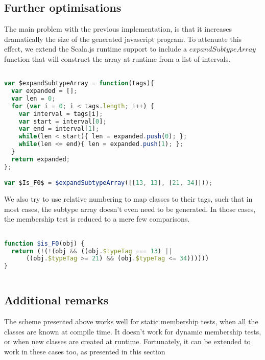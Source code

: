 \subsection{Further optimisations}
The main problem with the previous implementation, is that it increases
dramatically the size of the generated javascript program. To attenuate this
effect, we extend the Scala.js runtime support to include a
$expandSubtypeArray$ function that will construct the array at runtime from a
list of intervals.\\

\begin{lstlisting}[language=javascript,caption=Compressed subtype array,
label={lst:expandSubtypeArray}]

var $expandSubtypeArray = function(tags){
  var expanded = [];
  var len = 0;
  for (var i = 0; i < tags.length; i++) {
    var interval = tags[i];
    var start = interval[0];
    var end = interval[1];
    while(len < start){ len = expanded.push(0); };
    while(len <= end){ len = expanded.push(1); };
  }
  return expanded;
};

var $Is_F0$ = $expandSubtypeArray([[13, 13], [21, 34]]));
\end{lstlisting}

We also try to use relative numbering \cite{relativeNumbering} to map classes
to their tags, such that in most cases, the subtype array doesn't even need to
be generated. In those cases, the membership test is reduced to a mere few
comparisons.

\begin{lstlisting}[language=javascript,
caption=Constant folding of subtype array, 
label={lst:noSubtypeArray}]

function $is_F0(obj) {
  return (!(!(obj && ((obj.$typeTag === 13) || 
      ((obj.$typeTag >= 21) && (obj.$typeTag <= 34)))))) 
}
  
\end{lstlisting}

\subsection{Additional remarks}
The scheme presented above works well for static membership tests, when all the
classes are known at compile time. It doesn't work for dynamic membership
tests, or when new classes are created at runtime. Fortunately, it can be
extended to work in these cases too, as presented in this section

